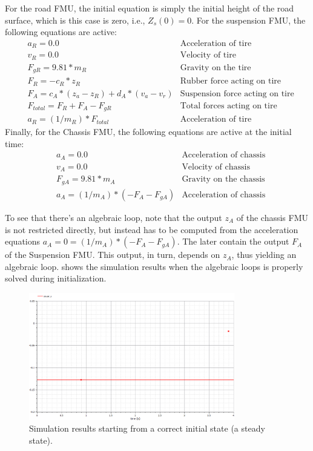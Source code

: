 For the road FMU, the initial equation is simply the initial height of the road surface, which is this case is zero, i.e., $Z_s(0)=0$.
For the suspension FMU, the following equations are active:
\begin{align}
& a_R = 0.0 & \text{Acceleration of tire} \\
& v_R = 0.0 & \text{Velocity of tire} \\
& F_{gR} = 9.81 * m_R  & \text{Gravity on the tire} \\
& F_R = - c_R * z_R  & \text{Rubber force acting on tire} \\
& F_A = c_A * (z_a - z_R) + d_A * (v_a - v_r)  & \text{Suspension force acting on tire} \\
& F_{\mathit{total}} = F_R + F_A - F_{gR} & \text{Total forces acting on tire} \\
& a_R = (1/m_R) * F_{\mathit{total}}  & \text{Acceleration of tire}
\end{align}
Finally, for the Chassis FMU, the following equations are active at the initial time:
\begin{align}
& a_A = 0.0 & \text{Acceleration of chassis} \\
& v_A = 0.0 & \text{Velocity of chassis} \\
& F_{gA} = 9.81 * m_A  & \text{Gravity on the chassis} \\
& a_A = (1/m_A) * (- F_A - F_{gA})  & \text{Acceleration of chassis}
\end{align}

To see that there's an algebraic loop, note that the output $z_A$ of the chassis FMU is not restricted directly, but instead has to be computed from the acceleration equations $a_A = 0 = (1/m_A) * (- F_A - F_{gA})$.
The later contain the output $F_A$ of the Suspension FMU.
This output, in turn, depends on $z_A$, thus yielding an algebraic loop.
 shows the simulation results when the algebraic loops is properly solved during initialization.

\begin{figure}[htb]
    \centering
    \includegraphics[width=0.8\textwidth]{images/init_state_correct_sim.png}
    \caption{Simulation results starting from a correct initial state (a steady state). }
    \label{fig:init_state_correct_sim}
\end{figure}


